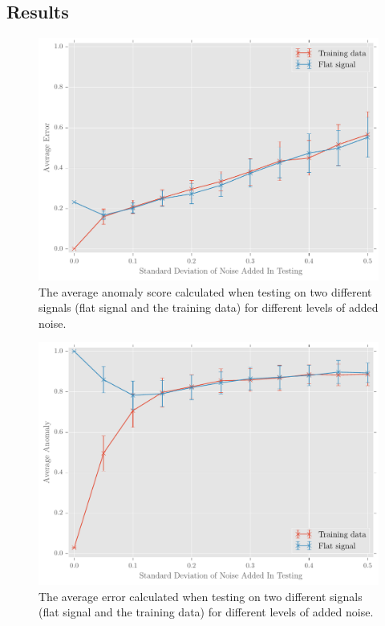 \documentclass[a4paper]{jpconf}
\begin{document}
	\subsection{Results}
		
		\begin{figure}
			\centering
			\includegraphics[width=\textwidth]{averageErrorPlot.pdf}
			\caption{\label{fig:averageError}The average anomaly score calculated when testing on two different signals (flat signal and the training data) for different levels of added noise.}
		\end{figure}
		\begin{figure}
			\centering
			\includegraphics[width=\textwidth]{averageAnomalyPlot.pdf}
			\caption{\label{fig:averageError}The average error calculated when testing on two different signals (flat signal and the training data) for different levels of added noise.}
		\end{figure}
		
\end{document}
